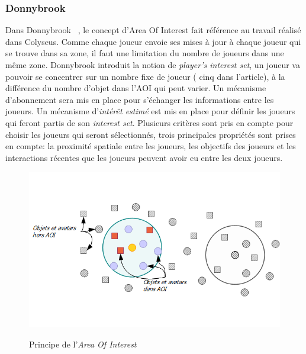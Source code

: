 	\subsubsection{Donnybrook}
	Dans Donnybrook ~\cite{1403002}, le concept d'Area Of Interest fait référence au travail réalisé dans Colyseus. Comme chaque joueur envoie ses mises à jour à chaque joueur qui se trouve dans sa zone, il faut une limitation du nombre de joueurs dans une même zone. Donnybrook introduit la notion de \textit{player's interest set}, un joueur va pouvoir se concentrer sur un nombre fixe de joueur ( cinq dans l'article), à la différence du nombre d'objet dans l'AOI qui peut varier. Un mécanisme d'abonnement sera mis en place pour s'échanger les informations entre les joueurs. Un mécanisme d'\textit{intérêt estimé} est mis en place pour définir les joueurs qui feront partis de son \textit{interest set}. Plusieurs critères sont pris en compte pour choisir les joueurs qui seront sélectionnés, trois principales propriétés sont prises en compte: la proximité spatiale entre les joueurs, les objectifs des joueurs et les interactions récentes que les joueurs peuvent avoir eu entre les deux joueurs.\\
	\vspace{1cm}
        \begin{figure}[!h]
        \centering
        \includegraphics[scale=0.7]{../Images/AOI.png}\\
        \caption{Principe de l'\textit{Area Of Interest}}
        \label{AOI}
        \end{figure}
	\vspace{1cm}
\newpage
